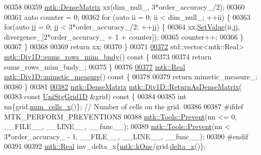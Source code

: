 \begin{DoxyCode}
{{00358 
00359   \hyperlink{classmtk_1_1DenseMatrix}{mtk::DenseMatrix} xx(dim\_null\_, 3*order\_accuracy\_/2);
00360 
00361   \textcolor{keyword}{auto} counter = 0;
00362   \textcolor{keywordflow}{for} (\textcolor{keyword}{auto} ii = 0; ii < dim\_null\_; ++ii) \{
00363     \textcolor{keywordflow}{for}(\textcolor{keyword}{auto} jj = 0; jj < 3*order\_accuracy\_/2; ++jj) \{
00364       xx.\hyperlink{classmtk_1_1DenseMatrix_a784ce5784109ac86bfb9d8562b334b13}{SetValue}(ii,jj, divergence\_[2*order\_accuracy\_ + 1 + counter]);
00365       counter++;
00366     \}
00367   \}
00368 
00369   \textcolor{keywordflow}{return} xx;
00370 \}
00371 
\hypertarget{mtk__div__1d_8cc_source_l00372}{}\hyperlink{classmtk_1_1Div1D_a8c611354217cb15cdb41c23b067fb398}{00372} std::vector<mtk::Real> \hyperlink{classmtk_1_1Div1D_a8c611354217cb15cdb41c23b067fb398}{mtk::Div1D::sums\_rows\_mim\_bndy}()\textcolor{keyword}{ const }\{
00373 
00374   \textcolor{keywordflow}{return} sums\_rows\_mim\_bndy\_;
00375 \}
00376 
\hypertarget{mtk__div__1d_8cc_source_l00377}{}\hyperlink{classmtk_1_1Div1D_a00caf61168e7b4b14b488eab0fe08ee4}{00377} \hyperlink{group__c01-roots_gac080bbbf5cbb5502c9f00405f894857d}{mtk::Real} \hyperlink{classmtk_1_1Div1D_a00caf61168e7b4b14b488eab0fe08ee4}{mtk::Div1D::mimetic\_measure}()\textcolor{keyword}{ const }\{
00378 
00379   \textcolor{keywordflow}{return} mimetic\_measure\_;
00380 \}
00381 
\hypertarget{mtk__div__1d_8cc_source_l00382}{}\hyperlink{classmtk_1_1Div1D_a213fddbaaf86e4840c6a9649b69c2d49}{00382} \hyperlink{classmtk_1_1DenseMatrix}{mtk::DenseMatrix} \hyperlink{classmtk_1_1Div1D_a213fddbaaf86e4840c6a9649b69c2d49}{mtk::Div1D::ReturnAsDenseMatrix}(
00383   \textcolor{keyword}{const} \hyperlink{classmtk_1_1UniStgGrid1D}{UniStgGrid1D} &grid)\textcolor{keyword}{ const }\{
00384 
00385   \textcolor{keywordtype}{int} nn\{grid.\hyperlink{classmtk_1_1UniStgGrid1D_af1b3729d8afa07be5b2775ed68015b80}{num\_cells\_x}()\}; \textcolor{comment}{// Number of cells on the grid.}
00386 
00387 \textcolor{preprocessor}{  #ifdef MTK\_PERFORM\_PREVENTIONS}
00388   \hyperlink{classmtk_1_1Tools_a332324c6f25e66be9dff48c5987a3b9f}{mtk::Tools::Prevent}(nn <= 0, \_\_FILE\_\_, \_\_LINE\_\_, \_\_func\_\_);
00389   \hyperlink{classmtk_1_1Tools_a332324c6f25e66be9dff48c5987a3b9f}{mtk::Tools::Prevent}(nn < 3*order\_accuracy\_ - 1, \_\_FILE\_\_, \_\_LINE\_\_, \_\_func\_\_);
00390 \textcolor{preprocessor}{  #endif}
00391 
00392   \hyperlink{group__c01-roots_gac080bbbf5cbb5502c9f00405f894857d}{mtk::Real} inv\_delta\_x\{\hyperlink{group__c01-roots_ga26407c24d43b6b95480943340d285c71}{mtk::kOne}/grid.\hyperlink{classmtk_1_1UniStgGrid1D_a6e7173b01241632cf509496d66b9f74c}{delta\_x}()\};
}}
\end{DoxyCode}
